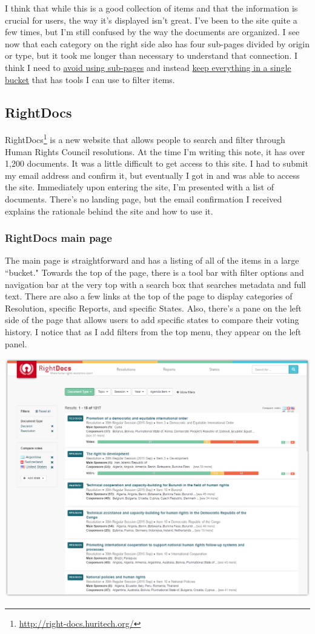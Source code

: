 \documentclass{article}
\begin{document}
I think that while this is a good collection of items and that the information is crucial for users, the way it's displayed isn't great. I've been to the site quite a few times, but I'm still confused by the way the documents are organized. I see now that each category on the right side also has four sub-pages divided by origin or type, but it took me longer than necessary to understand that connection. I think I need to \ul{avoid using sub-pages} and instead \ul{keep everything in a single bucket} that has tools I can use to filter items. 

\subsection{RightDocs}
RightDocs\footnote{\url{http://right-docs.huritech.org/}} is a new website that allows people to search and filter through Human Rights Council resolutions. At the time I'm writing this note, it has over 1,200 documents. It was a little difficult to get access to this site. I had to submit my email address and confirm it, but eventually I got in and was able to access the site. Immediately upon entering the site, I'm presented with a list of documents. There's no landing page, but the email confirmation I received explains the rationale behind the site and how to use it.

\subsubsection{RightDocs main page}
The main page is straightforward and has a listing of all of the items in a large ``bucket." Towards the top of the page, there is a tool bar with filter options and navigation bar at the very top with a search box that searches metadata and full text. There are also a few links at the top of the page to display categories of Resolution, specific Reports, and specific States. Also, there's a pane on the left side of the page that allows users to add specific states to compare their voting history. I notice that as I add filters from the top menu, they appear on the left panel.

\noindent\includegraphics[width=\textwidth]{2016-06-09-RightDocs-Main}
\end{document}
